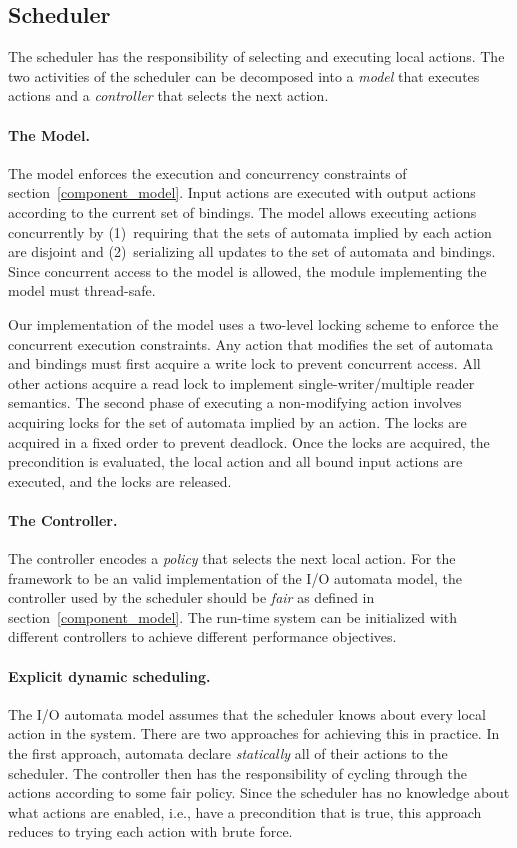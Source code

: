 \subsection{Scheduler}

The scheduler has the responsibility of selecting and executing local actions.
The two activities of the scheduler can be decomposed into a \emph{model} that executes actions and a \emph{controller} that selects the next action.

\paragraph{The Model.}
The model enforces the execution and concurrency constraints of section~\ref{component_model}.
Input actions are executed with output actions according to the current set of bindings.
The model allows executing actions concurrently by (1)~requiring that the sets of automata implied by each action are disjoint and (2)~serializing all updates to the set of automata and bindings.
Since concurrent access to the model is allowed, the module implementing the model must thread-safe.

Our implementation of the model uses a two-level locking scheme to enforce the concurrent execution constraints.
Any action that modifies the set of automata and bindings must first acquire a write lock to prevent concurrent access.
All other actions acquire a read lock to implement single-writer/multiple reader semantics.
The second phase of executing a non-modifying action involves acquiring locks for the set of automata implied by an action.
The locks are acquired in a fixed order to prevent deadlock.
Once the locks are acquired, the precondition is evaluated, the local action and all bound input actions are executed, and the locks are released.

\paragraph{The Controller.}
The controller encodes a \emph{policy} that selects the next local action.
For the framework to be an valid implementation of the I/O automata model, the controller used by the scheduler should be \emph{fair} as defined in section~\ref{component_model}.
The run-time system can be initialized with different controllers to achieve different performance objectives.

\paragraph{Explicit dynamic scheduling.}
The I/O automata model assumes that the scheduler knows about every local action in the system.
There are two approaches for achieving this in practice.
In the first approach, automata declare \emph{statically} all of their actions to the scheduler.
The controller then has the responsibility of cycling through the actions according to some fair policy.
Since the scheduler has no knowledge about what actions are enabled, i.e., have a precondition that is true, this approach reduces to trying each action with brute force.

